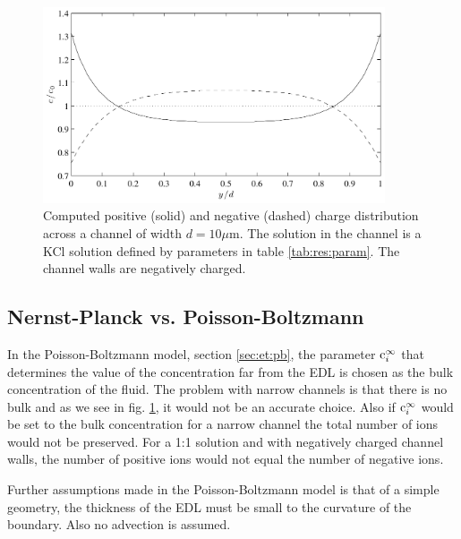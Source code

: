 \begin{figure}
\begin{center}
\includegraphics[width=0.9\textwidth]{fig/charge_1d.pdf}
\end{center}
\caption[Computed positive and negative charge distributions across a
  channel]{Computed positive (solid) and negative (dashed) charge
  distribution across a channel of width $d = 10 \mu$m. The solution
  in the channel is a KCl solution defined by parameters in table
  \ref{tab:res:param}. The channel walls are negatively charged.}
\label{fig:res:c_1d}
\end{figure}

\subsection{Nernst-Planck vs. Poisson-Boltzmann}
In the Poisson-Boltzmann model, section \ref{sec:et:pb}, the parameter
$\mathrm{c}_i^{\infty}$ that determines the value of the concentration far
from the EDL is chosen as the bulk concentration of the fluid. The
problem with narrow channels is that there is no bulk and as we see in
fig. \ref{fig:res:c_1d}, it would not be an accurate choice. Also if
$\mathrm{c}_i^{\infty}$ would be set to the bulk concentration for a narrow
channel the total number of ions would not be preserved. For a 1:1
solution and with negatively charged channel walls, the number of
positive ions would not equal the number of negative ions.

Further assumptions made in the Poisson-Boltzmann model is that of a
simple geometry, the thickness of the EDL must be small to the
curvature of the boundary. Also no advection is assumed. 


